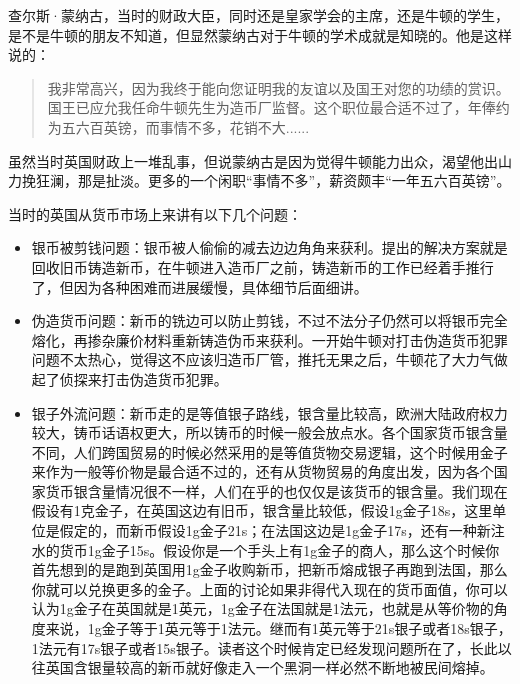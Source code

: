 \documentclass[12pt,oneside]{book}
\begin{document}
查尔斯·蒙纳古，当时的财政大臣，同时还是皇家学会的主席，还是牛顿的学生，是不是牛顿的朋友不知道，但显然蒙纳古对于牛顿的学术成就是知晓的。他是这样说的：

\begin{quotation}
我非常高兴，因为我终于能向您证明我的友谊以及国王对您的功绩的赏识。国王已应允我任命牛顿先生为造币厂监督。这个职位最合适不过了，年俸约为五六百英镑，而事情不多，花销不大......
\end{quotation}

虽然当时英国财政上一堆乱事，但说蒙纳古是因为觉得牛顿能力出众，渴望他出山力挽狂澜，那是扯淡。更多的一个闲职“事情不多”，薪资颇丰“一年五六百英镑”。

当时的英国从货币市场上来讲有以下几个问题：

\begin{itemize}
\item 银币被剪钱问题：银币被人偷偷的减去边边角角来获利。提出的解决方案就是回收旧币铸造新币，在牛顿进入造币厂之前，铸造新币的工作已经着手推行了，但因为各种困难而进展缓慢，具体细节后面细讲。

\item 伪造货币问题：新币的铣边可以防止剪钱，不过不法分子仍然可以将银币完全熔化，再掺杂廉价材料重新铸造伪币来获利。一开始牛顿对打击伪造货币犯罪问题不太热心，觉得这不应该归造币厂管，推托无果之后，牛顿花了大力气做起了侦探来打击伪造货币犯罪。

\item 银子外流问题：新币走的是等值银子路线，银含量比较高，欧洲大陆政府权力较大，铸币话语权更大，所以铸币的时候一般会放点水。各个国家货币银含量不同，人们跨国贸易的时候必然采用的是等值货物交易逻辑，这个时候用金子来作为一般等价物是最合适不过的，还有从货物贸易的角度出发，因为各个国家货币银含量情况很不一样，人们在乎的也仅仅是该货币的银含量。我们现在假设有1克金子，在英国这边有旧币，银含量比较低，假设1g金子18s，这里单位是假定的，而新币假设1g金子21s；在法国这边是1g金子17s，还有一种新注水的货币1g金子15s。假设你是一个手头上有1g金子的商人，那么这个时候你首先想到的是跑到英国用1g金子收购新币，把新币熔成银子再跑到法国，那么你就可以兑换更多的金子。上面的讨论如果非得代入现在的货币面值，你可以认为1g金子在英国就是1英元，1g金子在法国就是1法元，也就是从等价物的角度来说，1g金子等于1英元等于1法元。继而有1英元等于21s银子或者18s银子，1法元有17s银子或者15s银子。读者这个时候肯定已经发现问题所在了，长此以往英国含银量较高的新币就好像走入一个黑洞一样必然不断地被民间熔掉。
\end{itemize}
\end{document}
